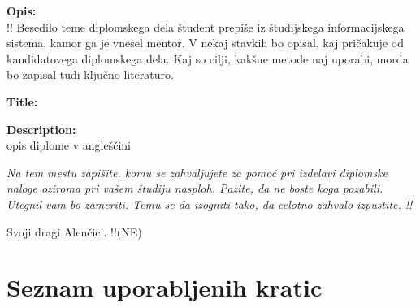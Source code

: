 \documentclass[a4paper,12pt,openright]{book}
\newcommand{\clearemptydoublepage}{\newpage{\pagestyle{empty}\cleardoublepage}}
\begin{document}
\bigskip
\noindent\textbf{Opis:}\\ !!
Besedilo teme diplomskega dela študent prepiše iz študijskega informacijskega sistema, kamor ga je vnesel mentor. 
V nekaj stavkih bo opisal, kaj pričakuje od kandidatovega diplomskega dela. 
Kaj so cilji, kakšne metode naj uporabi, morda bo zapisal tudi ključno literaturo.

\bigskip
\noindent\textbf{Title:} 


\bigskip
\noindent\textbf{Description:}\\
opis diplome v angleščini

\vfill



\vspace{2cm}

\clearemptydoublepage

\thispagestyle{empty}\mbox{}\vfill\null\it%
\noindent 
Na tem mestu zapišite, komu se zahvaljujete za pomoč pri izdelavi diplomske naloge oziroma pri vašem študiju nasploh. Pazite, da ne boste koga pozabili. Utegnil vam bo zameriti. Temu se da izogniti tako, da celotno zahvalo izpustite.  !!
\rm\normalfont

\clearemptydoublepage

\thispagestyle{empty}\mbox{}{\textheight}\mbox{}\hfill\begin{minipage}{0.55\textwidth}%
Svoji dragi Alenčici. !!(NE)
\normalfont\end{minipage}

\clearemptydoublepage


\pagestyle{empty}
\def\thepage{}%
\tableofcontents{}


\clearemptydoublepage


\chapter*{Seznam uporabljenih kratic}
\end{document}
